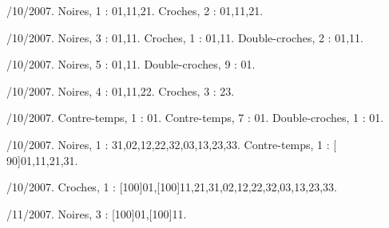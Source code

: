 /10/2007.
\Drums Noires, 1 : 01,11,21.
\Drums Croches, 2 : 01,11,21.

/10/2007. 
\Drums Noires, 3 : 01,11.
\Drums Croches, 1 : 01,11.
\Drums Double-croches, 2 : 01,11.

/10/2007. 
\Drums [80]Noires, 5 : 01,11.
\Drums Double-croches, 9 : 01.

/10/2007. 
\Drums [60]Noires, 4 : 01,11,22.
\Drums Croches, 3 : 23.

/10/2007. 
\Drums [80]Contre-temps, 1 : 01.
\Drums Contre-temps, 7 : 01.
\Drums Double-croches, 1 : 01.

/10/2007. 
\Drums Noires, 1 : 31,02,12,22,32,03,13,23,33.
\Drums Contre-temps, 1 : [ 90]01,11,21,31.

/10/2007. 
\Drums Croches, 1 : [100]01,[100]11,21,31,02,12,22,32,03,13,23,33.


/11/2007. 
\Drums Noires, 3 : [100]01,[100]11.


\endinput